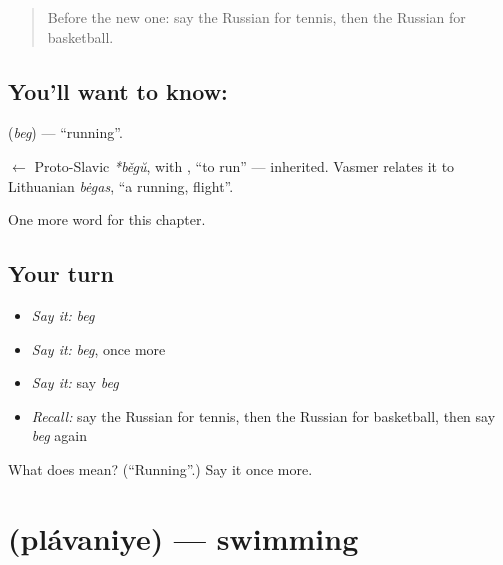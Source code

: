 \label{lesson:RU-C252-beg}



\begin{quote}
Before the new one: say the Russian for tennis, then the Russian for basketball.
\end{quote}

\subsection*{You'll want to know: }
\textbf{} (\emph{beg}) — \textquotedblleft{}running\textquotedblright{}.

\begin{cousinweb}
\textbf{} $\leftarrow$ Proto-Slavic \emph{*běgŭ}, with \emph{}, \textquotedblleft{}to run\textquotedblright{} — inherited. Vasmer relates it to Lithuanian \emph{bėgas}, \textquotedblleft{}a running, flight\textquotedblright{}.
\end{cousinweb}

\begin{grammarlens}[title={What you've built}]
One more word for this chapter.
\end{grammarlens}

\subsection*{Your turn}
\begin{itemize}
\raggedright
  \item \emph{Say it:} \emph{beg}
  \item \emph{Say it:} \emph{beg}, once more
  \item \emph{Say it:} say \emph{beg}
  \item \emph{Recall:} say the Russian for tennis, then the Russian for basketball, then say \emph{beg} again
\end{itemize}

\begin{tcolorbox}[breakable,colback=teal!4,colframe=teal!35!black,title={Before you move on}]
What does  mean? (\textquotedblleft{}Running\textquotedblright{}.) Say it once more.
\end{tcolorbox}
\section[\texorpdfstring{\ru{плавание} (plávaniye)}{плавание (plávaniye)}]{ (plávaniye) — swimming}


